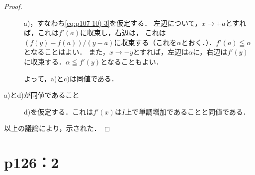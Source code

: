\documentclass[a4paper,10pt,fleqn]{ltjsarticle}
\begin{document}
\begin{tleftbar}
\begin{proof}
\begin{description}
                  a)，すなわち\eqref{eq:p107 10) 3}を仮定する．
                  左辺について，$x \to + a$とすれば，これは$f'(a)$に収束し，右辺は，
                  これは$(f(y)-f(a))/(y-a)$に収束する（これを$\alpha$とおく．）．$f'(a) \leqq \alpha$となることはよい．
                  また，$x \to - y$とすれば，左辺は$\alpha$に，右辺は$f'(y)$に収束する．$\alpha \leqq f'(y)$となることもよい．

                  よって，a)とc)は同値である．

            \item[a)とd)が同値であること] \mbox{} \par
                  d)を仮定する．これは$f'(x)$は$I$上で単調増加であることと同値である．
        \end{description}
        以上の議論により，示された．
    \end{proof}
\end{tleftbar}


\section*{p126：2}
\end{document}

